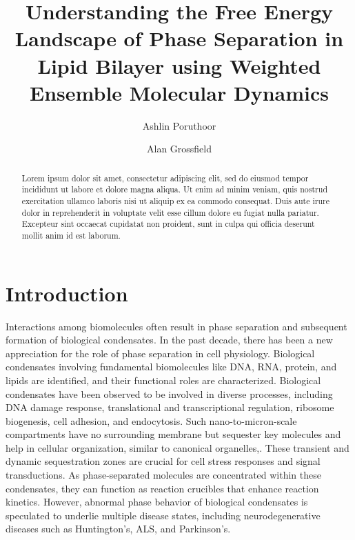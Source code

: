 \documentclass{biophys-new}
\title{Understanding the Free Energy Landscape of Phase Separation in Lipid Bilayer using Weighted Ensemble Molecular Dynamics}
\author[1]{Ashlin Poruthoor}
\author[1,*]{Alan Grossfield}
\affil[1]{University of Rochester Medical Center, Rochester, NY 14620}
\begin{document}
\begin{frontmatter}
\begin{abstract}

Lorem ipsum dolor sit amet, consectetur adipiscing elit, sed do eiusmod tempor incididunt ut labore et dolore magna aliqua. Ut enim ad minim veniam, quis nostrud exercitation ullamco laboris nisi ut aliquip ex ea commodo consequat. Duis aute irure dolor in reprehenderit in voluptate velit esse cillum dolore eu fugiat nulla pariatur. Excepteur sint occaecat cupidatat non proident, sunt in culpa qui officia deserunt mollit anim id est laborum.

\end{abstract}

\end{frontmatter}

\section*{Introduction}

Interactions among biomolecules often result in phase separation and subsequent formation of biological condensates\cite{Banani2016}.
In the past decade, there has been a new appreciation for the role of phase separation in cell physiology\cite{Banani2017}. Biological condensates involving fundamental biomolecules like DNA\cite{Larson2017}, RNA\cite{Langdon2018}, protein\cite{Li2012}, and lipids\cite{Sezgin2017} are identified, and their functional roles are characterized.
Biological condensates have been observed to be involved in diverse processes, including DNA damage response\cite{Altmeyer2015}, translational\cite{Decker2012} and transcriptional\cite{Lallemand-Breitenbach2010} regulation, ribosome biogenesis\cite{Feric2016}, cell adhesion\cite{Case2015}, and endocytosis\cite{Degreif2019}.
Such nano-to-micron-scale compartments have no surrounding membrane but sequester key molecules and help in cellular organization, similar to canonical organelles\cite{Mao2011},\cite{Boisvert2007}.
These transient and dynamic sequestration zones are crucial for cell stress responses\cite{Boisvert2007} and signal transductions\cite{Janosi2012}.
As phase-separated molecules are concentrated within these condensates, they can function as reaction crucibles that enhance reaction kinetics\cite{Strulson2012}.
However, abnormal phase behavior of biological condensates is speculated to underlie multiple disease states, including neurodegenerative diseases such as Huntington's\cite{Li2016}, ALS\cite{Jain2017}, and Parkinson's\cite{Ray2020}.
\end{document}
